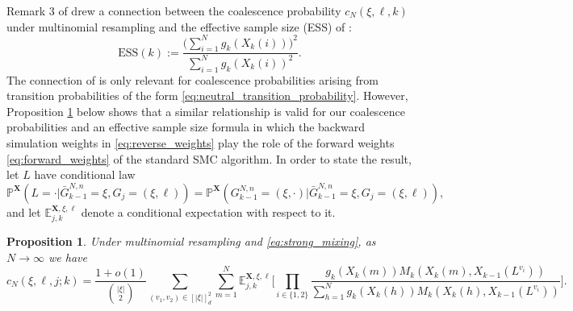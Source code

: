 \documentclass[a4paper,11pt]{article}
\newtheorem{prop}{Proposition}
\theoremstyle{definition}
\newcommand{\bbP}{\mathbb{P}}
\newcommand{\bbE}{\mathbb{E}}
\newcommand{\bfX}{\mathbf{X}}
\begin{document}
Remark 3 of \cite{koskela2020annals} drew a connection between the coalescence probability $c_N( \xi, \ell, k )$ under multinomial resampling and the effective sample size (ESS) of \cite{kong94}:
\begin{equation}\label{eq:ess}
\text{ESS}( k ) := \frac{\big(\sum_{i = 1}^N g_k( X_k( i ) ) \big)^2}{\sum_{ i = 1 }^N g_k( X_k( i ) )^2}.
\end{equation}
The connection of \cite[Remark 3]{koskela2020annals} is only relevant for coalescence probabilities arising from transition probabilities of the form \eqref{eq:neutral_transition_probability}.
However, Proposition \ref{prop:ess} below shows that a similar relationship is valid for our coalescence probabilities and an effective sample size formula in which the backward simulation weights in \eqref{eq:reverse_weights} play the role of the forward weights \eqref{eq:forward_weights} of the standard SMC algorithm.
In order to state the result, let $L$ have conditional law
\begin{equation}\label{labelling_law}
\bbP^{\mathbf{X}}(L = \cdot | \bar{ G }_{ k - 1 }^{ N, n } = \xi, G_j = ( \xi, \ell ) ) = \bbP^{ \bfX }( G_{ k - 1 }^{ N, n } = ( \xi, \cdot ) | \bar{ G }_{ k - 1 }^{ N, n } = \xi, G_j = ( \xi, \ell ) ),
\end{equation}
and let $\bbE^{ \bfX, \xi, \ell }_{ j, k }$ denote a conditional expectation with respect to it.
\begin{prop} \label{prop:ess}
Under multinomial resampling and \eqref{eq:strong_mixing}, as $N \to \infty$ we have
\begin{equation*}
c_N( \xi, \ell, j; k ) = \frac{ 1 + o(1 ) }{ \binom{ | \xi | }{ 2 } } \sum_{ ( v_1, v_2 ) \in [ | \xi | ]_d^2 } \sum_{ m = 1 }^N \bbE_{ j, k }^{ \bfX, \xi, \ell } \Bigg[ \prod_{ i \in \{ 1, 2 \} } \frac{ g_k( X_k( m ) ) M_k( X_k( m ), X_{ k - 1 }( L^{ v_i } ) ) }{ \sum_{ h = 1 }^N g_k( X_k( h ) ) M_k( X_k( h ), X_{ k - 1 }( L^{ v_i } ) ) } \Bigg].
\end{equation*}
\end{prop}
\end{document}
